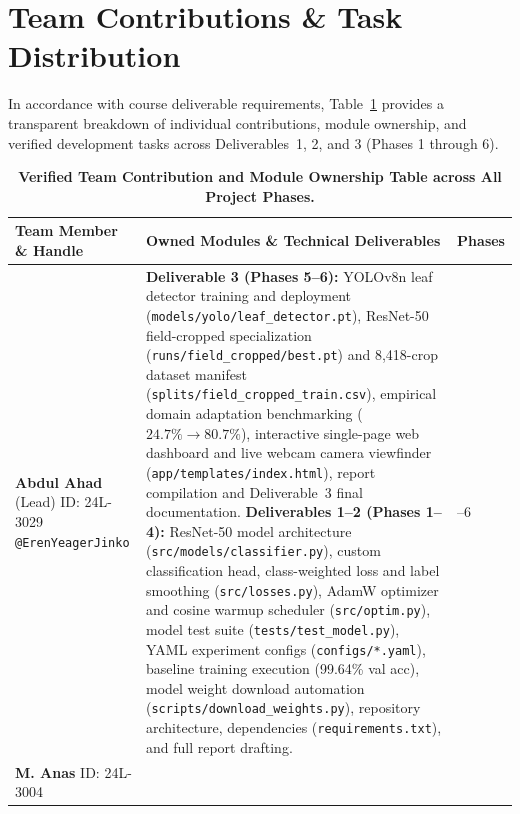 \clearpage
\section{Team Contributions \& Task Distribution}
\label{sec:contributions}

In accordance with course deliverable requirements, Table~\ref{tab:contribution_table} provides a transparent breakdown of individual contributions, module ownership, and verified development tasks across Deliverables~1, 2, and 3 (Phases 1 through 6).

\begin{table}[!ht]
\centering
\caption{\textbf{Verified Team Contribution and Module Ownership Table across All Project Phases.}}
\label{tab:contribution_table}
\footnotesize
\setlength{\tabcolsep}{4pt}
\renewcommand{\arraystretch}{1.08}
\begin{tabular}{@{}p{3.5cm}p{10.2cm}>{\centering\arraybackslash}p{1.2cm}@{}}
\toprule
\textbf{Team Member \& Handle} & \textbf{Owned Modules \& Technical Deliverables} & \textbf{Phases} \\
\midrule
\textbf{Abdul Ahad} (Lead)\newline
ID: 24L-3029\newline
\texttt{@ErenYeagerJinko} & 
\textbf{Deliverable 3 (Phases 5--6):} YOLOv8n leaf detector training and deployment (\texttt{models/yolo/leaf\_detector.pt}), ResNet-50 field-cropped specialization (\texttt{runs/field\_cropped/best.pt}) and 8,418-crop dataset manifest (\texttt{splits/field\_cropped\_train.csv}), empirical domain adaptation benchmarking ($24.7\% \rightarrow 80.7\%$), interactive single-page web dashboard and live webcam camera viewfinder (\texttt{app/templates/index.html}), report compilation and Deliverable~3 final documentation. \newline
\textbf{Deliverables 1--2 (Phases 1--4):} ResNet-50 model architecture (\texttt{src/models/classifier.py}), custom classification head, class-weighted loss and label smoothing (\texttt{src/losses.py}), AdamW optimizer and cosine warmup scheduler (\texttt{src/optim.py}), model test suite (\texttt{tests/test\_model.py}), YAML experiment configs (\texttt{configs/*.yaml}), baseline training execution (99.64\% val acc), model weight download automation (\texttt{scripts/download\_weights.py}), repository architecture, dependencies (\texttt{requirements.txt}), and full report drafting. & 1--6 \\
\midrule
\textbf{M. Anas}\newline
ID: 24L-3004\newline

\end{tabular}
\end{table}
